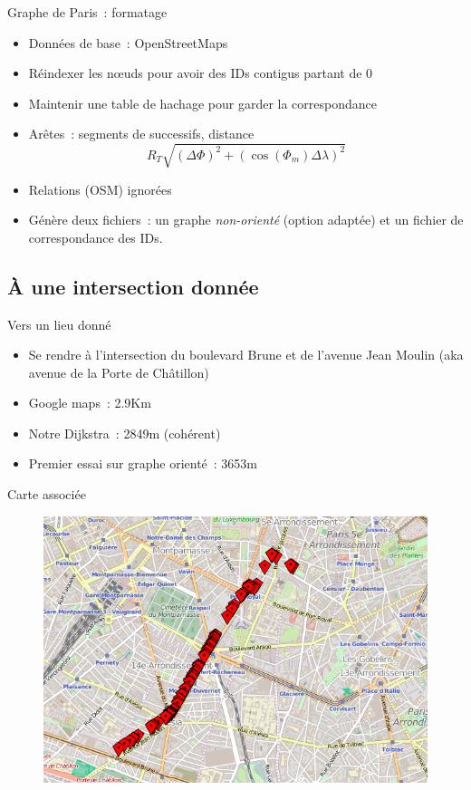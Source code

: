 \documentclass[11pt]{beamer}
\begin{document}
\begin{frame}{Graphe de Paris~: formatage}
\begin{itemize}
\item Données de base~: OpenStreetMaps
\item \alert{Réindexer} les n\oe uds pour avoir des IDs contigus partant de 0
\item Maintenir une table de hachage pour garder la correspondance
\item \alert{Arêtes}~: segments de  successifs, distance
\[ R_T \sqrt{\left(\Delta \Phi\right)^2 + \left(\cos\left(\Phi_m\right) \Delta \lambda\right)^2} \]
\item Relations (OSM) ignorées
\item Génère deux fichiers~: un graphe \emph{non-orienté} (option adaptée) et un fichier de correspondance des IDs.
\end{itemize}
\end{frame}

\subsection{À une intersection donnée}

\begin{frame}{Vers un lieu donné}
\begin{itemize}
\item Se rendre à l'intersection du \alert{boulevard Brune} et de l'\alert{avenue Jean Moulin} (aka avenue de la Porte de Châtillon)
\item Google maps~: 2.9Km
\item Notre Dijkstra~: 2849m (cohérent)
\item Premier essai sur graphe \alert{orienté}~: 3653m
\end{itemize}
\end{frame}

\begin{frame}{Carte associée}
\begin{figure}
\includegraphics[width=0.9\linewidth]{map1.png}
\end{figure}
\end{frame}
\end{document}
